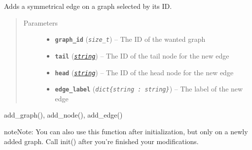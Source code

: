 \documentclass[letterpaper,10pt,english]{sphinxmanual}
\begin{document}

\begin{fulllineitems}
\label{doc:gedlibpy.add_symmetrical_edge}
Adds a symmetrical edge on a graph selected by its ID.
\begin{quote}\begin{description}
\item[{Parameters}] \leavevmode\begin{itemize}
\item {} 
\textbf{\texttt{graph\_id}} (\emph{\texttt{size\_t}}) -- The ID of the wanted graph

\item {} 
\textbf{\texttt{tail}} (\href{https://docs.python.org/3/library/string.html\#module-string}{\emph{\texttt{string}}}) -- The ID of the tail node for the new edge

\item {} 
\textbf{\texttt{head}} (\href{https://docs.python.org/3/library/string.html\#module-string}{\emph{\texttt{string}}}) -- The ID of the head node for the new edge

\item {} 
\textbf{\texttt{edge\_label}} (\emph{\texttt{dict\{string : string\}}}) -- The label of the new edge

\end{itemize}

\end{description}\end{quote}




add\_graph(), add\_node(), add\_edge()



\begin{notice}{note}{Note:}
You can also use this function after initialization, but only on a newly added graph. Call init() after you're finished your modifications.
\end{notice}

\end{fulllineitems}

\end{document}
